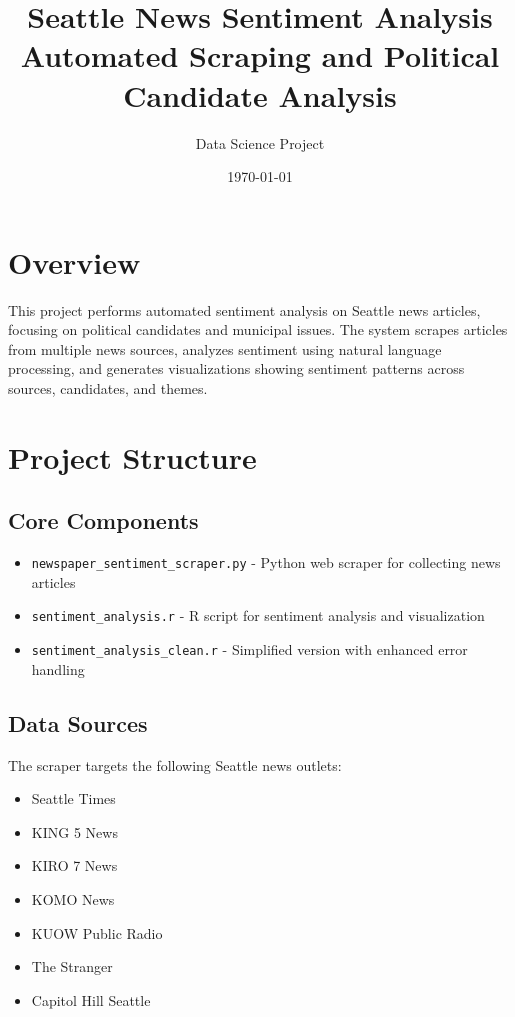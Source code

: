 \documentclass[11pt]{article}
\title{Seattle News Sentiment Analysis \\ Automated Scraping and Political Candidate Analysis}
\author{Data Science Project}
\date{\today}
\begin{document}
\maketitle

\section{Overview}

This project performs automated sentiment analysis on Seattle news articles, focusing on political candidates and municipal issues. The system scrapes articles from multiple news sources, analyzes sentiment using natural language processing, and generates visualizations showing sentiment patterns across sources, candidates, and themes.

\section{Project Structure}

\subsection{Core Components}

\begin{itemize}
    \item \texttt{newspaper\_sentiment\_scraper.py} - Python web scraper for collecting news articles
    \item \texttt{sentiment\_analysis.r} - R script for sentiment analysis and visualization
    \item \texttt{sentiment\_analysis\_clean.r} - Simplified version with enhanced error handling
\end{itemize}

\subsection{Data Sources}

The scraper targets the following Seattle news outlets:
\begin{itemize}
    \item Seattle Times
    \item KING 5 News
    \item KIRO 7 News
    \item KOMO News
    \item KUOW Public Radio
    \item The Stranger
    \item Capitol Hill Seattle
\end{itemize}
\end{document}
